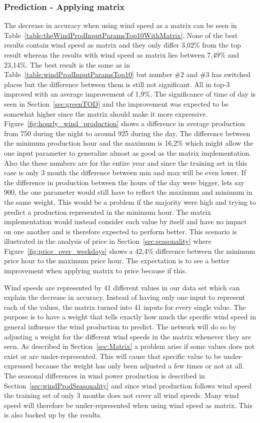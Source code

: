 \subsubsection{Prediction - Applying matrix}
The decrease in accuracy when using wind speed as a matrix can be seen in Table~\ref{table:theWindProdInputParamsTop10WithMatrix}. None of the best results contain wind speed as matrix and they only differ 3,02\% from the top result whereas the results with wind speed as matrix lies between 7,49\% and 23,14\%. The best result is the same as in Table~\ref{table:windProdInputParamsTop10} but number \#2 and \#3 has switched places but the difference between them is still not significant. All in top-3 improved with an average improvement of 1,9\%. The significance of time of day is seen in Section~\ref{sec:greenTOD} and the improvement was expected to be somewhat higher since the matrix should make it more expressive. Figure~\ref{fig:hourly_wind_production} shows a difference in average production from 750 during the night to around 925 during the day. The difference between the minimum production hour and the maximum is 16,2\% which might allow the one input parameter to generalize almost as good as the matrix implementation. Also the these numbers are for the entire year and since the training set in this case is only 3 month the difference between min and max will be even lower. If the difference in production between the hours of the day were bigger, lets say 900, the one parameter would still have to reflect the maximum and minimum in the same weight. This would be a problem if the majority were high and trying to predict a production represented in the minimum hour. The matrix implementation would instead consider each value by itself and have no impact on one another and is therefore expected to perform better. This scenario is illustrated in the analysis of price in Section~\ref{sec:seasonality} where Figure~\ref{fig:price_over_weekdays} shows a 42,4\% difference between the minimum price hour to the maximum price hour. The expectation is to see a better improvement when applying matrix to price because if this. 

Wind speeds are represented by 41 different values in our data set which can explain the decrease in accuracy. Instead of having only one input to represent each of the values, the matrix turned into 41 inputs for every single value. The purpose is to have a weight that tells exactly how much the specific wind speed in general influence the wind production to predict. The network will do so by adjusting a weight for the different wind speeds in the matrix whenever they are seen. As described in Section~\ref{sec:Matrix} a problem arise if some values does not exist or are under-represented. This will cause that specific value to be under-expressed because the weight has only been adjusted a few times or not at all. The seasonal differences in wind power production is described in Section~\ref{sec:windProdSeasonality} and since wind production follows wind speed the training set of only 3 months does not cover all wind speeds. Many wind speed will therefore be under-represented when using wind speed as matrix. This is also backed up by the results.

